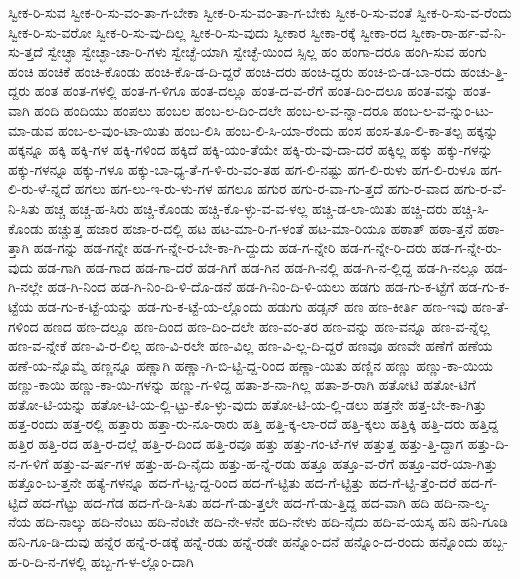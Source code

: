 {ಸ್ವೀಕ-ರಿ-ಸುವ
ಸ್ವೀಕ-ರಿ-ಸು-ವಂ-ತಾ-ಗ-ಬೇಕಾ
ಸ್ವೀಕ-ರಿ-ಸು-ವಂ-ತಾ-ಗ-ಬೇಕು
ಸ್ವೀಕ-ರಿ-ಸು-ವಂತೆ
ಸ್ವೀಕ-ರಿ-ಸು-ವ-ರೆಂದು
ಸ್ವೀಕ-ರಿ-ಸು-ವರೋ
ಸ್ವೀಕ-ರಿ-ಸು-ವು-ದಿಲ್ಲ
ಸ್ವೀಕ-ರಿ-ಸು-ವುದು
ಸ್ವೀಕಾರ
ಸ್ವೀಕಾ-ರಕ್ಕೆ
ಸ್ವೀಕಾ-ರದ
ಸ್ವೀಕಾ-ರಾ-ರ್ಹ-ವೆ-ನಿ-ಸು-ತ್ತದೆ
ಸ್ವೇಚ್ಛಾ
ಸ್ವೇಚ್ಛಾ-ಚಾ-ರಿ-ಗಳು
ಸ್ವೇಚ್ಛೆ-ಯಾಗಿ
ಸ್ವೇಚ್ಛೆ-ಯಿಂದ
ಸ್ಸಿಲ್ಲ
ಹಂ
ಹಂಗಾ-ದರೂ
ಹಂಗಿ-ಸುವ
ಹಂಗು
ಹಂಚಿ
ಹಂಚಿಕೆ
ಹಂಚಿ-ಕೊಂಡು
ಹಂಚಿ-ಕೊ-ಡ-ದಿ-ದ್ದರೆ
ಹಂಚಿ-ದರು
ಹಂಚಿ-ದ್ದರು
ಹಂಚಿ-ಬಿ-ಡ-ಬಾ-ರದು
ಹಂಚು-ತ್ತಿ-ದ್ದರು
ಹಂತ
ಹಂತ-ಗಳಲ್ಲಿ
ಹಂತ-ಗ-ಳಿಗೂ
ಹಂತ-ದಲ್ಲೂ
ಹಂತ-ದ-ವ-ರೆಗೆ
ಹಂತ-ದಿಂ-ದಲೂ
ಹಂತ-ವನ್ನು
ಹಂತ-ವಾಗಿ
ಹಂದಿ
ಹಂದಿಯು
ಹಂಪಲು
ಹಂಬಲ
ಹಂಬ-ಲ-ದಿಂ-ದಲೇ
ಹಂಬ-ಲ-ವ-ನ್ನಾ-ದರೂ
ಹಂಬ-ಲ-ವ-ನ್ನುಂ-ಟು-ಮಾ-ಡುವ
ಹಂಬ-ಲ-ವುಂ-ಟಾ-ಯಿತು
ಹಂಬ-ಲಿಸಿ
ಹಂಬ-ಲಿ-ಸಿ-ಯಾ-ರೆಂದು
ಹಂಸ
ಹಂಸ-ತೂ-ಲಿ-ಕಾ-ತಲ್ಪ
ಹಕ್ಕನ್ನು
ಹಕ್ಕನ್ನೂ
ಹಕ್ಕಿ
ಹಕ್ಕಿ-ಗಳ
ಹಕ್ಕಿ-ಗಳಿಂದ
ಹಕ್ಕಿದೆ
ಹಕ್ಕಿ-ಯಂ-ತೆಯೇ
ಹಕ್ಕಿ-ರು-ವು-ದಾ-ದರೆ
ಹಕ್ಕಿಲ್ಲ
ಹಕ್ಕು
ಹಕ್ಕು-ಗಳನ್ನು
ಹಕ್ಕು-ಗಳನ್ನೂ
ಹಕ್ಕು-ಗಳೂ
ಹಕ್ಕು-ಬಾ-ಧ್ಯ-ತೆ-ಗ-ಳಿ-ರು-ವಂ-ತಹ
ಹಗ-ಲಿ-ನಷ್ಟು
ಹಗ-ಲಿ-ರುಳು
ಹಗ-ಲಿ-ರುಳೂ
ಹಗ-ಲಿ-ರು-ಳೆ-ನ್ನದೆ
ಹಗಲು
ಹಗ-ಲು-ಇ-ರು-ಳು-ಗಳ
ಹಗಲೂ
ಹಗುರ
ಹಗು-ರ-ವಾ-ಗು-ತ್ತದೆ
ಹಗು-ರ-ವಾದ
ಹಗು-ರ-ವೆ-ನಿ-ಸಿತು
ಹಚ್ಚ
ಹಚ್ಚ-ಹ-ಸಿರು
ಹಚ್ಚಿ-ಕೊಂಡು
ಹಚ್ಚಿ-ಕೊ-ಳ್ಳು-ವ-ವ-ಳಲ್ಲ
ಹಚ್ಚಿ-ಡ-ಲಾ-ಯಿತು
ಹಚ್ಚಿ-ದರು
ಹಚ್ಚಿ-ಸಿ-ಕೊಂಡು
ಹಚ್ಚುತ್ತ
ಹಜಾರ
ಹಜಾ-ರ-ದಲ್ಲಿ
ಹಟ
ಹಟ-ಮಾ-ರಿ-ಗ-ಳಂತೆ
ಹಟ-ಮಾ-ರಿಯೂ
ಹಠಾತ್
ಹಠಾ-ತ್ತನೆ
ಹಠಾ-ತ್ತಾಗಿ
ಹಡ-ಗನ್ನು
ಹಡ-ಗನ್ನೇ
ಹಡ-ಗ-ನ್ನೇ-ರ-ಬೇ-ಕಾ-ಗಿ-ದ್ದುದು
ಹಡ-ಗ-ನ್ನೇರಿ
ಹಡ-ಗ-ನ್ನೇ-ರಿ-ದರು
ಹಡ-ಗ-ನ್ನೇ-ರು-ವುದು
ಹಡ-ಗಾಗಿ
ಹಡ-ಗಾದ
ಹಡ-ಗಾ-ದರೆ
ಹಡ-ಗಿಗೆ
ಹಡ-ಗಿನ
ಹಡ-ಗಿ-ನಲ್ಲಿ
ಹಡ-ಗಿ-ನ-ಲ್ಲಿದ್ದ
ಹಡ-ಗಿ-ನಲ್ಲೂ
ಹಡ-ಗಿ-ನಲ್ಲೇ
ಹಡ-ಗಿ-ನಿಂದ
ಹಡ-ಗಿ-ನಿಂ-ದಿ-ಳಿ-ದೊ-ಡನೆ
ಹಡ-ಗಿ-ನಿಂ-ದಿ-ಳಿ-ಯಲು
ಹಡಗು
ಹಡ-ಗು-ಕ-ಟ್ಟೆಗೆ
ಹಡ-ಗು-ಕ-ಟ್ಟೆಯ
ಹಡ-ಗು-ಕ-ಟ್ಟೆ-ಯನ್ನು
ಹಡ-ಗು-ಕ-ಟ್ಟೆ-ಯ-ಲ್ಲೊಂದು
ಹಡುಗು
ಹಡ್ಸನ್
ಹಣ
ಹಣ-ಕೀರ್ತಿ
ಹಣ-ಇವು
ಹಣ-ತೆ-ಗಳಿಂದ
ಹಣದ
ಹಣ-ದಲ್ಲೂ
ಹಣ-ದಿಂದ
ಹಣ-ದಿಂ-ದಲೇ
ಹಣ-ವಂ-ತರ
ಹಣ-ವನ್ನು
ಹಣ-ವನ್ನೂ
ಹಣ-ವ-ನ್ನೆಲ್ಲ
ಹಣ-ವ-ನ್ನೇಕೆ
ಹಣ-ವಿ-ರ-ಲಿಲ್ಲ
ಹಣ-ವಿ-ರಲೇ
ಹಣ-ವಿಲ್ಲ
ಹಣ-ವಿ-ಲ್ಲ-ದಿ-ದ್ದರೆ
ಹಣವೂ
ಹಣವೇ
ಹಣೆಗೆ
ಹಣೆಯ
ಹಣೆ-ಯ-ನ್ನೊಮ್ಮೆ
ಹಣ್ಣನ್ನೂ
ಹಣ್ಣಾಗಿ
ಹಣ್ಣಾ-ಗಿ-ಬಿ-ಟ್ಟಿ-ದ್ದ-ರಿಂದ
ಹಣ್ಣಾ-ಯಿತು
ಹಣ್ಣಿನ
ಹಣ್ಣು
ಹಣ್ಣು-ಕಾ-ಯಿಯ
ಹಣ್ಣು-ಕಾಯಿ
ಹಣ್ಣು-ಕಾ-ಯಿ-ಗಳನ್ನು
ಹಣ್ಣು-ಗ-ಳಿದ್ದ
ಹತಾ-ಶ-ನಾ-ಗಿಲ್ಲ
ಹತಾ-ಶ-ರಾಗಿ
ಹತೋಟಿ
ಹತೋ-ಟಿಗೆ
ಹತೋ-ಟಿ-ಯನ್ನು
ಹತೋ-ಟಿ-ಯ-ಲ್ಲಿ-ಟ್ಟು-ಕೊ-ಳ್ಳು-ವುದು
ಹತೋ-ಟಿ-ಯ-ಲ್ಲಿ-ಡಲು
ಹತ್ತನೇ
ಹತ್ತ-ಬೇ-ಕಾ-ಗಿತ್ತು
ಹತ್ತ-ರಂದು
ಹತ್ತ-ರಲ್ಲಿ
ಹತ್ತಾರು
ಹತ್ತಾ-ರು-ನೂ-ರಾರು
ಹತ್ತಿ
ಹತ್ತಿ-ಕ್ಕ-ಲಾ-ರದೆ
ಹತ್ತಿ-ಕ್ಕಲು
ಹತ್ತಿಕ್ಕಿ
ಹತ್ತಿ-ದರು
ಹತ್ತಿದ್ದ
ಹತ್ತಿರ
ಹತ್ತಿ-ರದ
ಹತ್ತಿ-ರ-ದಲ್ಲೆ
ಹತ್ತಿ-ರ-ದಿಂದ
ಹತ್ತಿ-ರವೂ
ಹತ್ತು
ಹತ್ತು-ಗಂ-ಟೆ-ಗಳ
ಹತ್ತುತ್ತ
ಹತ್ತು-ತ್ತಿ-ದ್ದಾಗ
ಹತ್ತು-ದಿ-ನ-ಗ-ಳಿಗೆ
ಹತ್ತು-ವ-ರ್ಷ-ಗಳ
ಹತ್ತು-ಹ-ದಿ-ನೈದು
ಹತ್ತು-ಹ-ನ್ನೆ-ರಡು
ಹತ್ತೂ
ಹತ್ತೂ-ವ-ರೆಗೆ
ಹತ್ತೂ-ವರೆ-ಯಾ-ಗಿತ್ತು
ಹತ್ತೊಂ-ಬ-ತ್ತನೇ
ಹತ್ಯೆ-ಗಳನ್ನೂ
ಹದ-ಗೆ-ಟ್ಟ-ದ್ದ-ರಿಂದ
ಹದ-ಗೆ-ಟ್ಟಿತು
ಹದ-ಗೆ-ಟ್ಟಿತ್ತು
ಹದ-ಗೆ-ಟ್ಟಿ-ತ್ತೆಂ-ದರೆ
ಹದ-ಗೆ-ಟ್ಟಿದೆ
ಹದ-ಗೆಟ್ಟು
ಹದ-ಗೆಡ
ಹದ-ಗೆ-ಡಿ-ಸಿತು
ಹದ-ಗೆ-ಡು-ತ್ತಲೇ
ಹದ-ಗೆ-ಡು-ತ್ತಿದ್ದ
ಹದ-ವಾಗಿ
ಹದಿ
ಹದಿ-ನಾ-ಲ್ಕ-ನೆಯ
ಹದಿ-ನಾಲ್ಕು
ಹದಿ-ನೆಂಟು
ಹದಿ-ನೆಂಟೇ
ಹದಿ-ನೇ-ಳನೇ
ಹದಿ-ನೇಳು
ಹದಿ-ನೈದು
ಹದಿ-ವ-ಯಸ್ಕ
ಹನಿ
ಹನಿ-ಗೂಡಿ
ಹನಿ-ಗೂ-ಡಿ-ದುವು
ಹನ್ನೆರ
ಹನ್ನೆ-ರ-ಡಕ್ಕೆ
ಹನ್ನೆ-ರಡು
ಹನ್ನೆ-ರಡೇ
ಹನ್ನೊಂ-ದನೆ
ಹನ್ನೊಂ-ದ-ರಂದು
ಹನ್ನೊಂದು
ಹಬ್ಬ-ಹ-ರಿ-ದಿ-ನ-ಗಳಲ್ಲಿ
ಹಬ್ಬ-ಗ-ಳ-ಲ್ಲೊಂ-ದಾಗಿ
}
